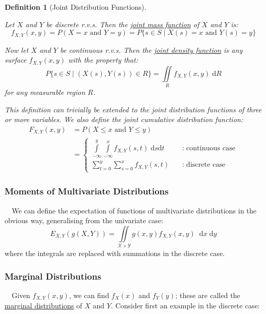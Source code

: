 \documentclass[12pt,a4paper]{article}
\newtheorem{defn}[thm]{Definition}
\newcommand{\diff}{\;\mathrm{d}}
\begin{document}
\begin{defn}[Joint Distribution Functions]$\;$\par
\vspace{1cm}

Let $X$ and $Y$ be discrete r.v.s. Then the \underline{joint mass function} of $X$ and $Y$ is:
$$f_{X,Y}(x,y) = P(X=x \text{ and } Y=y) = P\{s \in S \; | \; X(s) = x \text{ and } Y(s) = y\}$$

Now let $X$ and $Y$ be continuous r.v.s. Then the \underline{joint density function} is any surface $f_{X,Y}(x,y)$ with the property that:
$$P\{s \in S \; | \; (X(s),Y(s)) \in R\} = \iint\limits_R \! f_{X,Y}(x,y)\; \mathrm{d}R$$
for any measurable region $R$.\par
\vspace{1cm}

This definition can trivially be extended to the joint distribution functions of three or more variables. We also define the joint cumulative distribution function:
\begin{align*}
F_{X,Y}(x,y) &= P(X\leq x \text{ and } Y\leq y)\\
&= \left\{ \begin{array}{cl} \int\limits_{-\infty}^y\int\limits_{-\infty}^x\!\! f_{X,Y}(s,t)\;\mathrm{d}s\mathrm{d}t\quad & : \; \text{continuous case}\\ \sum\limits_{t=0}^y\sum\limits_{s=0}^x f_{X,Y}(s,t)\quad & : \; \text{discrete case} \end{array} \right.
\end{align*}

\end{defn}

\subsubsection{Moments of Multivariate Distributions}

$\quad$We can define the expectation of functions of multivariate distributions in the obvious way, generalising from the univariate case:
$$E_{X,Y}(g(X,Y)) = \iint\limits_{\mathcal{X}\times\mathcal{Y}}\!\! g(x,y)f_{X,Y}(x,y)\; \diff x\diff y$$
where the integrals are replaced with summations in the discrete case.

\subsubsection{Marginal Distributions}

$\quad$Given $f_{X,Y}(x,y)$, we can find $f_X(x)$ and $f_Y(y)$; these are called the \underline{marginal distributions} of $X$ and $Y$. Consider first an example in the discrete case:
\end{document}
